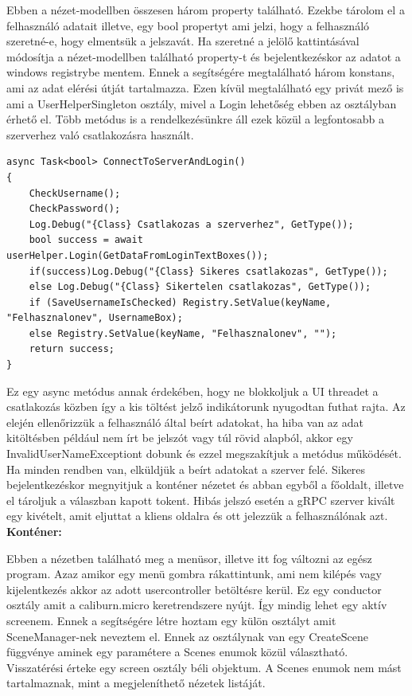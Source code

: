 \documentclass[
]{thesis-ekf}
\theoremstyle{definition}
\theoremstyle{remark}
\begin{document}
Ebben a nézet-modellben összesen három property található. Ezekbe tárolom el a felhasználó adatait illetve, egy bool propertyt ami jelzi, hogy a felhasználó szeretné-e, hogy elmentsük a jelszavát. Ha szeretné a jelölő kattintásával módosítja a nézet-modellben található property-t és bejelentkezéskor az adatot a windows registrybe mentem. Ennek a segítségére megtalálható három konstans, ami az adat elérési útját tartalmazza. Ezen kívül megtalálható egy privát mező is ami a UserHelperSingleton osztály, mivel a Login lehetőség ebben az osztályban érhető el. Több metódus is a rendelkezésünkre áll ezek közül a legfontosabb a szerverhez való csatlakozásra használt.

\begin{lstlisting}
async Task<bool> ConnectToServerAndLogin()
{
	CheckUsername();
	CheckPassword();
	Log.Debug("{Class} Csatlakozas a szerverhez", GetType());
	bool success = await userHelper.Login(GetDataFromLoginTextBoxes());
	if(success)Log.Debug("{Class} Sikeres csatlakozas", GetType());
	else Log.Debug("{Class} Sikertelen csatlakozas", GetType());
	if (SaveUsernameIsChecked) Registry.SetValue(keyName, "Felhasznalonev", UsernameBox);
	else Registry.SetValue(keyName, "Felhasznalonev", "");
	return success;
}
\end{lstlisting}
Ez egy async metódus annak érdekében, hogy ne blokkoljuk a UI threadet a csatlakozás közben így a kis töltést jelző indikátorunk nyugodtan futhat rajta. Az elején ellenőrizzük a felhasználó által beírt adatokat, ha hiba van az adat kitöltésben például nem írt be jelszót vagy túl rövid alapból, akkor egy InvalidUserNameExceptiont dobunk és ezzel megszakítjuk a metódus működését. Ha minden rendben van, elküldjük a beírt adatokat a szerver felé. Sikeres bejelentkezéskor megnyitjuk a konténer nézetet és abban egyből a főoldalt, illetve el tároljuk a válaszban kapott tokent. Hibás jelszó esetén a gRPC szerver kivált egy kivételt, amit eljuttat a kliens oldalra és ott jelezzük a felhasználónak azt.\\
\textbf{Konténer:}

Ebben a nézetben található meg a menüsor, illetve itt fog változni az egész program. Azaz amikor egy menü gombra rákattintunk, ami nem kilépés vagy kijelentkezés akkor az adott usercontroller betöltésre kerül. Ez egy conductor osztály amit a caliburn.micro keretrendszere nyújt. Így mindig lehet egy aktív screenem. Ennek a segítségére létre hoztam egy külön osztályt amit SceneManager-nek neveztem el. Ennek az osztálynak van egy CreateScene függvénye aminek egy paramétere a Scenes enumok közül választható. Visszatérési érteke egy screen osztály béli objektum. A Scenes enumok nem mást tartalmaznak, mint a megjeleníthető nézetek listáját. 
\end{document}
